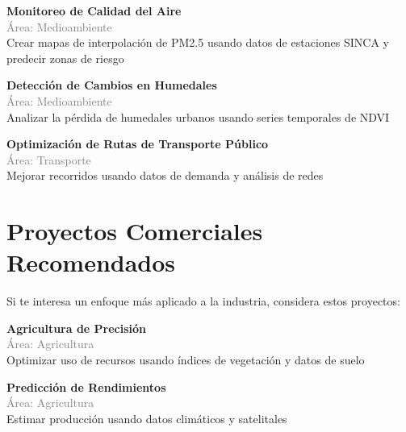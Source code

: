 \documentclass[11pt,a4paper]{article}
\begin{document}
\begin{tcolorbox}[colback=green!5,colframe=darkgreen,title={\small Proyecto Científico \#2}]
\textbf{Monitoreo de Calidad del Aire}\\[0.2cm]
\textcolor{gray}{\small Área: Medioambiente}\\[0.2cm]
Crear mapas de interpolación de PM2.5 usando datos de estaciones SINCA y predecir zonas de riesgo
\end{tcolorbox}


\begin{tcolorbox}[colback=green!5,colframe=darkgreen,title={\small Proyecto Científico \#3}]
\textbf{Detección de Cambios en Humedales}\\[0.2cm]
\textcolor{gray}{\small Área: Medioambiente}\\[0.2cm]
Analizar la pérdida de humedales urbanos usando series temporales de NDVI
\end{tcolorbox}


\begin{tcolorbox}[colback=green!5,colframe=darkgreen,title={\small Proyecto Científico \#4}]
\textbf{Optimización de Rutas de Transporte Público}\\[0.2cm]
\textcolor{gray}{\small Área: Transporte}\\[0.2cm]
Mejorar recorridos usando datos de demanda y análisis de redes
\end{tcolorbox}


\section*{ Proyectos Comerciales Recomendados}

Si te interesa un enfoque más aplicado a la industria, considera estos proyectos:


\begin{tcolorbox}[colback=orange!5,colframe=darkorange,title={\small Proyecto Comercial \#1}]
\textbf{Agricultura de Precisión}\\[0.2cm]
\textcolor{gray}{\small Área: Agricultura}\\[0.2cm]
Optimizar uso de recursos usando índices de vegetación y datos de suelo
\end{tcolorbox}


\begin{tcolorbox}[colback=orange!5,colframe=darkorange,title={\small Proyecto Comercial \#2}]
\textbf{Predicción de Rendimientos}\\[0.2cm]
\textcolor{gray}{\small Área: Agricultura}\\[0.2cm]
Estimar producción usando datos climáticos y satelitales
\end{tcolorbox}
\end{document}
